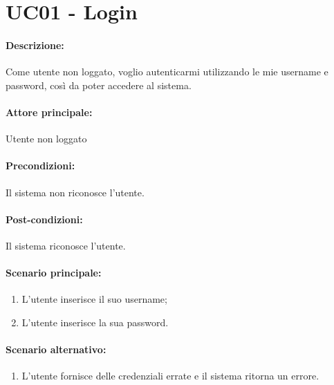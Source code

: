 \section{UC01 - Login}

\paragraph{Descrizione:}
Come utente non loggato, voglio autenticarmi utilizzando le mie username e password, così da poter accedere al sistema.

\paragraph{Attore principale:}
Utente non loggato

\paragraph{Precondizioni:}
Il sistema non riconosce l'utente.

\paragraph{Post-condizioni:}
Il sistema riconosce l'utente.

\paragraph{Scenario principale:}
\begin{enumerate}
    \item L'utente inserisce il suo username;
    \item L'utente inserisce la sua password.
\end{enumerate}

\paragraph{Scenario alternativo:}
\begin{enumerate}
    \item L'utente fornisce delle credenziali errate e il sistema ritorna un errore.
\end{enumerate}
